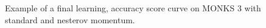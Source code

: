 \begin{appendices}
            \begin{figure}[H]
                \centering
                \begin{subfigure}{0.40\textwidth}
                    \caption{}
                    \label{fig:monks_3_MSE_SGD}
                \end{subfigure}
                \begin{subfigure}{0.40\textwidth}
                    \caption{}
                    \label{fig:monks_3_ACC_SGD}
                \end{subfigure}
                \caption{Example of a final learning, accuracy score curve on MONKS 3 with standard and nesterov momentum.}
                \label{fig:monks_3_SGD}
            \end{figure}


\end{appendices}
